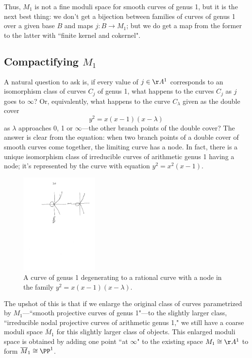 Thus, $M_1$ is not a fine moduli space for smooth curves of genus 1, but it is the next best thing: we don't get a bijection between families of curves of genus 1 over a given base $B$ and maps $j : B \to M_1$; but we do get a map from the former to the latter with ``finite kernel and cokernel".

\subsection{Compactifying $M_1$}

A natural question to ask is, if every value of $j \in \AA^1$ corresponds to an isomorphism class of curves $C_j$ of genus 1, what happens to the curves $C_j$ as $j$ goes to $\infty$? Or, equivalently, what happens to the curve $C_\lambda$ given as the double cover
$$
y^2 = x(x-1)(x - \lambda)
$$
as $\lambda$ approaches 0, 1 or $\infty$---the other branch points of the double cover? The answer is clear from the equation: when two branch points of a double cover of smooth curves come together, the limiting curve has a node. In fact, there is a unique isomorphism class of irreducible curves of arithmetic genus 1 having a node; it's represented by the curve with equation $y^2=x^2(x-1)$.

\begin{figure}\label{Fig7.0}
\centerline {\includegraphics[height=2in]{"Fig7.0.pdf"}}
\caption{A curve of genus 1 degenerating to a rational curve with a node
in the family $y^2 = x(x-1)(x - \lambda)$.}
\end{figure}


The upshot of this is that if we enlarge the original class of curves parametrized by $M_1$---``smooth projective curves of genus 1"---to the slightly larger class, ``irreducible nodal projective curves of arithmetic genus 1," we still have a coarse moduli space $\overline M_1$ for this slightly larger class of objects. This enlarged moduli space is obtained by adding one point ``at $\infty$" to the existing space $M_1 \cong \AA^1$ to form $\overline M_1 \cong \PP^1$.

